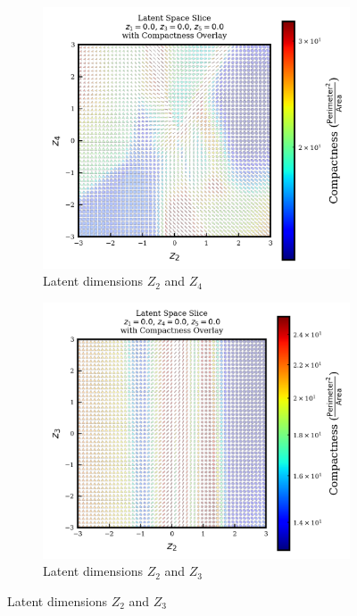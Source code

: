 \documentclass{article}
\begin{document}
\begin{figure}[H]
  \centering

  \begin{subfigure}{0.48\textwidth}
    \centering
    \includegraphics[width=\textwidth]{figures/VAEmodels/model4/varying_z2_z4_fixed_z1=0.0_z3=0.0_z5=0.0.png}
    \caption{Latent dimensions $Z_2$ and $Z_4$}
    \label{fig:model4_z2_z4}
  \end{subfigure}
  \hfill
  \begin{subfigure}{0.48\textwidth}
    \centering
    \includegraphics[width=\textwidth]{figures/VAEmodels/model4/varying_z2_z3_fixed_z1=0.0_z4=0.0_z5=0.0.png}
    \caption{Latent dimensions $Z_2$ and $Z_3$}
    \label{fig:model4_z2_z3}
  \end{subfigure}


\end{figure}
\end{document}
